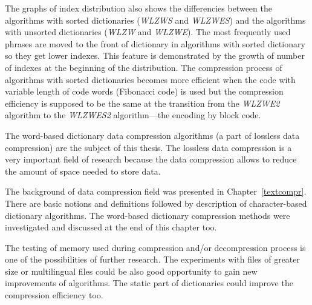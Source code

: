 \documentclass[thesis=M,english]{FITthesis}[2012/10/20]
\begin{document}
The graphs of index distribution also shows the differencies between the algorithms with sorted dictionaries (\textit{WLZWS} and \textit{WLZWES}) and the algorithms with unsorted dictionaries (\textit{WLZW} and \textit{WLZWE}). The most frequently used phrases are moved to the front of dictionary in algorithms with sorted dictionary so they get lower indexes. This feature is demonstrated by the growth of number of indexes at the beginning of the distribution. The compression process of algorithms with sorted dictionaries becomes more efficient when the code with variable length of code words (Fibonacci code) is used but the compression efficiency is supposed to be the same at the transition from the \textit{WLZWE2} algorithm to the \textit{WLZWES2} algorithm---the encoding by block code. 

\begin{conclusion}
	The word-based dictionary data compression algorithms (a part of lossless data compression) are the subject of this thesis. The lossless data compression is a very important field of research because the data compression allows to reduce the amount of space needed to store data.

	The background of data compression field was presented in Chapter~\ref{textcompr}. There are basic notions and definitions followed by description of character-based dictionary algorithms. The word-based dictionary compression methods were investigated and discussed at the end of this chapter too.


	The testing of memory used during compression and/or decompression process is one of the possibilities of further research. The experiments with files of greater size or multilingual files could be also good opportunity to gain new improvements of algorithms. The static part of dictionaries could improve the compression efficiency too.


\end{conclusion}
\end{document}
